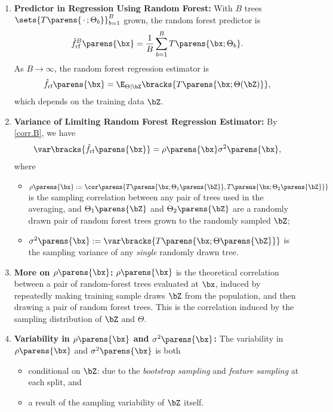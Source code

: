 \documentclass[12pt]{article}
\begin{document}
\begin{enumerate}[label=\textbf{\arabic*.}]

	\item \textbf{Predictor in Regression Using Random Forest:} With $B$ trees $\sets{T \parens{\,\cdot\,; \Theta_b}}_{b=1}^B$ grown, the random forest predictor is 
	\begin{align*}
		\hat{f}_{\text{rf}}^B \parens{\bx} = \frac{1}{B} \sum_{b=1}^B T \parens{\bx; \Theta_b}. 
	\end{align*}
	As $B \to \infty$, the random forest regression estimator is 
	\begin{align*}
		\hat{f}_{\text{rf}} \parens{\bx} = \E_{\Theta \mid \bZ} \bracks{T \parens{\bx; \Theta (\bZ)}}, 
	\end{align*}
	which depends on the training data $\bZ$. 
	
	\item \textbf{Variance of Limiting Random Forest Regression Estimator:} By \eqref{corr.B}, we have 
	\begin{align*}
		\var \bracks{\hat{f}_{\text{rf}} \parens{\bx}} = \rho \parens{\bx} \sigma^2 \parens{\bx}, 
	\end{align*}
	where 
	\begin{itemize}
		\item $\rho \parens{\bx} := \cor \parens{T \parens{\bx; \Theta_1 \parens{\bZ}}, T \parens{\bx; \Theta_2 \parens{\bZ}}}$ is the sampling correlation between any pair of trees used in the averaging, and $\Theta_1 \parens{\bZ}$ and $\Theta_2 \parens{\bZ}$ are a randomly drawn pair of random forest trees grown to the randomly sampled $\bZ$; 
		\item $\sigma^2 \parens{\bx} := \var \bracks{T \parens{\bx; \Theta \parens{\bZ}}}$ is the sampling variance of any \textit{single} randomly drawn tree. 
	\end{itemize}
	
	\item \textbf{More on $\rho \parens{\bx}$:} $\rho \parens{\bx}$ is the theoretical correlation between a pair of random-forest trees evaluated at $\bx$, induced by repeatedly making training sample draws $\bZ$ from the population, and then drawing a pair of random forest trees. This is the correlation induced by the sampling distribution of $\bZ$ and $\Theta$.
	
	\item \textbf{Variability in $\rho \parens{\bx}$ and $\sigma^2 \parens{\bx}$:} The variability in $\rho \parens{\bx}$ and $\sigma^2 \parens{\bx}$ is both 
	\begin{itemize}
		\item conditional on $\bZ$: due to the \textit{bootstrap sampling} and \textit{feature sampling} at each split, and 
		\item a result of the sampling variability of $\bZ$ itself. 
	\end{itemize}
	

\end{enumerate}
\end{document}
